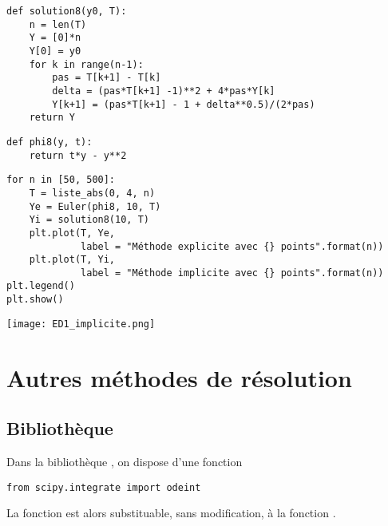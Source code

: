 \begin{Answer}
\begin{lstlisting}
def solution8(y0, T):
    n = len(T)
    Y = [0]*n
    Y[0] = y0
    for k in range(n-1):
        pas = T[k+1] - T[k]
        delta = (pas*T[k+1] -1)**2 + 4*pas*Y[k]
        Y[k+1] = (pas*T[k+1] - 1 + delta**0.5)/(2*pas)
    return Y
\end{lstlisting}

\begin{lstlisting}
def phi8(y, t):
    return t*y - y**2
\end{lstlisting}


\begin{lstlisting}
for n in [50, 500]:
    T = liste_abs(0, 4, n)
    Ye = Euler(phi8, 10, T)
    Yi = solution8(10, T)
    plt.plot(T, Ye, 
             label = "Méthode explicite avec {} points".format(n))
    plt.plot(T, Yi, 
             label = "Méthode implicite avec {} points".format(n))
plt.legend()
plt.show()
\end{lstlisting}
\begin{center}
\texttt{[image: ED1\_implicite.png]}
\end{center}
\newpage
\end{Answer}
\section{Autres méthodes de résolution}
\subsection{Bibliothèque }
Dans la bibliothèque , on dispose d'une fonction 
\begin{lstlisting}
from scipy.integrate import odeint
\end{lstlisting}
La fonction  est alors substituable, sans modification, à la fonction .

